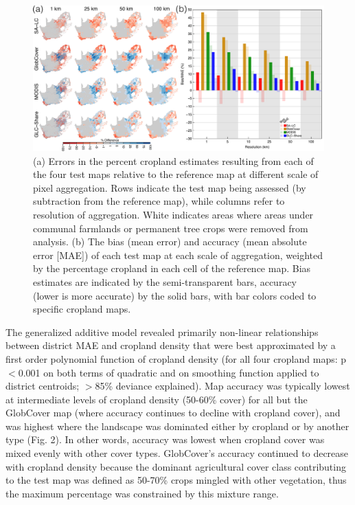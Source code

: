 \documentclass[12 pt, titlepage, a4paper]{article}
\begin{document}
\begin{figure}[!ht]
\centerline{\includegraphics[width=1\textwidth]{figures/fig1.pdf}}
\vspace{-0.15 cm}
\caption{(a) Errors in the percent cropland estimates resulting from each of the four test maps relative to the reference map at different scale of pixel aggregation. Rows indicate the test map being assessed (by subtraction from the reference map), while columns refer to resolution of aggregation. White indicates areas where areas under communal farmlands or permanent tree crops were removed from analysis. (b) The bias (mean error) and accuracy (mean absolute error [MAE]) of each test map at each scale of aggregation, weighted by the percentage cropland in each cell of the reference map. Bias estimates are indicated by the semi-transparent bars, accuracy (lower is more accurate) by the solid bars, with bar colors coded to specific cropland maps.}
\label{afoto1}
\end{figure}

The generalized additive model revealed primarily non-linear relationships between district MAE and cropland density that were best approximated by a first order polynomial function of cropland density (for all four cropland maps: p$<$0.001 on both terms of quadratic and on smoothing function applied to district centroids; $>$85\% deviance explained). Map accuracy was typically lowest at intermediate levels of cropland density (50-60\% cover) for all but the GlobCover map (where accuracy continues to decline with cropland cover), and was highest where the landscape was dominated either by cropland or by another type (Fig. 2). In other words, accuracy was lowest when cropland cover was mixed evenly with other cover types. GlobCover's accuracy continued to decrease with cropland density because the dominant agricultural cover class contributing to the test map was defined as 50-70\% crops mingled with other vegetation, thus the maximum percentage was constrained by this mixture range.  
\end{document}
